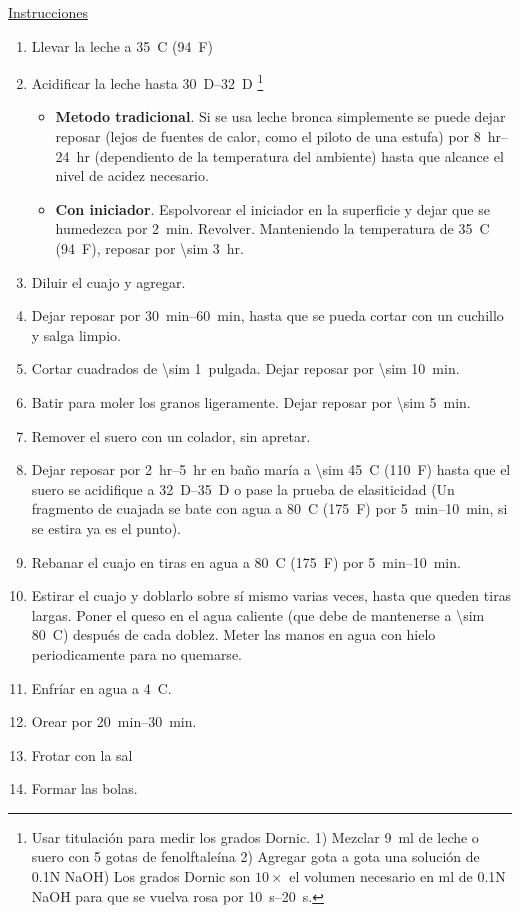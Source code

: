 \underline{Instrucciones}
\begin{enumerate}
\item Llevar la leche a \SI{35}{C} (\SI{94}{F})
\item Acidificar la leche hasta \SIrange{30}{32}{D} \footnote{Usar titulación para medir los grados Dornic. 1) Mezclar \SI{9}{ml} de leche o suero con 5 gotas de fenolftaleína 2) Agregar gota a gota una solución de 0.1N NaOH) Los grados Dornic son $10\times$ el volumen necesario en ml de 0.1N NaOH para que se vuelva rosa por \SIrange{10}{20}{s}.} 
\begin{itemize}
\item \textbf{Metodo tradicional}. Si se usa leche bronca simplemente se puede dejar reposar (lejos de fuentes de calor, como el piloto de una estufa) por \SIrange{8}{24}{hr} (dependiento de la temperatura del ambiente) hasta que alcance el nivel de acidez necesario.
\item \textbf{Con iniciador}. Espolvorear el iniciador en la superficie y dejar que se humedezca por \SI{2}{min}. Revolver. Manteniendo la temperatura de \SI{35}{C} (\SI{94}{F}), reposar por \SI{\sim 3}{hr}.
\end{itemize}
\item Diluir el cuajo y agregar.
\item Dejar reposar por \SIrange{30}{60}{min}, hasta que se pueda cortar con un cuchillo y salga limpio.
\item Cortar cuadrados de \SI{\sim 1}{pulgada}. Dejar reposar por \SI{\sim 10}{min}.
\item Batir para moler los granos ligeramente. Dejar reposar por \SI{\sim 5}{min}.
\item Remover el suero con un colador, sin apretar.
\item Dejar reposar por \SIrange{2}{5}{hr} en baño maría a \SI{\sim 45}{C} (\SI{110}{F}) hasta que el suero se acidifique a \SIrange{32}{35}{D} o pase la prueba de elasiticidad (Un fragmento de cuajada se bate con agua a \SI{80}{C} (\SI{175}{F}) por \SIrange{5}{10}{min}, si se estira ya es el punto).
\item Rebanar el cuajo en tiras en agua a \SI{80}{C} (\SI{175}{F}) por  \SIrange{5}{10}{min}.
\item Estirar el cuajo y doblarlo sobre sí mismo varias veces, hasta que queden tiras largas. Poner el queso en el agua caliente (que debe de mantenerse a \SI{\sim 80}{C}) después de cada doblez. Meter las manos en agua con hielo periodicamente para no quemarse. 
\item Enfríar en agua a \SI{4}{C}.
\item Orear por \SIrange{20}{30}{min}.
\item Frotar con la sal
\item Formar las bolas.
\end{enumerate}
